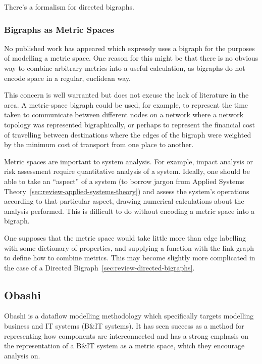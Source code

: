 There's a formalism for directed bigraphs. 

\subsubsection{Bigraphs as Metric Spaces}

No published work has appeared which expressly uses a bigraph for the purposes
of modelling a metric space. One reason for this might be that there is no
obvious way to combine arbitrary metrics into a useful calculation, as bigraphs
do not encode space in a regular, euclidean way.
\par

This concern is well warranted but does not excuse the lack of literature in the
area. A metric-space bigraph could be used, for example, to represent the time
taken to communicate between different nodes on a network where a network
topology was represented bigraphically, or perhaps to represent the financial
cost of travelling between destinations where the edges of the bigraph were
weighted by the minimum cost of transport from one place to another.
\par

Metric spaces are important to system analysis. For example, impact analysis or
risk assessment require quantitative analysis of a system. Ideally, one should
be able to take an ``aspect'' of a system (to borrow jargon from Applied Systems
Theory~\ref{sec:review-applied-systems-theory}) and assess the system's
operations according to that particular aspect, drawing numerical calculations
about the analysis performed. This is difficult to do without encoding a metric
space into a bigraph.
\par

One supposes that the metric space would take little more than edge labelling
with some dictionary of properties, and supplying a function with the link graph
to define how to combine metrics. This may become slightly more complicated in
the case of a Directed Bigraph~\ref{sec:review-directed-bigraphs}.
\par

\subsection{Obashi}

Obashi is a dataflow modelling methodology which specifically targets modelling
business and IT systems (B\&IT systems). It has seen success as a method for
representing how components are interconnected and has a strong emphasis on the
representation of a B\&IT system as a metric space, which they encourage analysis
on.
\par

